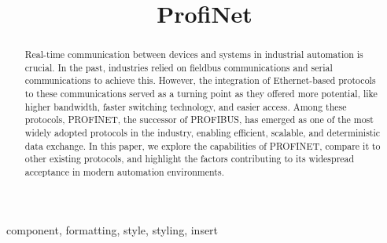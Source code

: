 \documentclass[conference]{IEEEtran}
\begin{document}
\title{ProfiNet\\}

\author{
\and
{}
\and
{}
}

\maketitle

\begin{abstract}
Real-time communication between devices and systems in industrial automation is crucial. In the past, industries relied on fieldbus communications and serial communications to achieve this. However, the integration of Ethernet-based protocols to these communications served as a turning point as they offered more potential, like higher bandwidth, faster switching technology, and easier access. Among these protocols, PROFINET, the successor of PROFIBUS, has emerged as one of the most widely adopted protocols in the industry, enabling efficient, scalable, and deterministic data exchange. In this paper, we explore the capabilities of PROFINET, compare it to other existing protocols, and highlight the factors contributing to its widespread acceptance in modern automation environments.

\end{abstract}

\begin{IEEEkeywords}
component, formatting, style, styling, insert
\end{IEEEkeywords}
\end{document}
